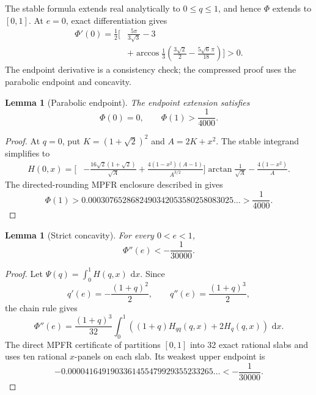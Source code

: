 \documentclass[11pt]{article}
\numberwithin{equation}{section}
\newtheorem{lemma}[theorem]{Lemma}
\theoremstyle{remark}
\newcommand{\dd}{\,\mathrm d}
\begin{document}
The stable formula extends real analytically to \(0\le q\le1\), and hence \(\Phi\) extends to \([0,1]\).  At \(e=0\), exact differentiation gives
\begin{equation}
\begin{aligned}
  \Phi'(0)=\frac12\bigg[&\frac{5\pi}{3\sqrt3}-3\\
  &+\arccos\frac13
  \left(\frac{3\sqrt2}{2}-\frac{5\sqrt6\,\pi}{18}\right)
  \bigg]>0.
\end{aligned}
\label{eq:phi-prime-zero}
\end{equation}
The endpoint derivative is a consistency check; the compressed proof uses the parabolic endpoint and concavity.

\begin{lemma}[Parabolic endpoint]
\label{lem:parabolic-endpoint}
The endpoint extension satisfies
\begin{equation}
  \Phi(0)=0,
  \qquad
  \Phi(1)>\frac1{4000}.
  \label{eq:endpoint-bound}
\end{equation}
\end{lemma}

\begin{proof}
At \(q=0\), put \(K=(1+\sqrt2)^2\) and \(A=2K+x^2\).  The stable integrand simplifies to
\begin{equation}
\begin{aligned}
H(0,x)=\bigg[&-\frac{16\sqrt2(1+\sqrt2)}{\sqrt A}
 +\frac{4(1-x^2)(A-1)}{A^{3/2}}\bigg]
 \arctan\frac1{\sqrt A}
 -\frac{4(1-x^2)}A.
\end{aligned}
\label{eq:endpoint-integrand}
\end{equation}
The directed-rounding MPFR enclosure described in  gives
\[
  \Phi(1)>
  0.0003076528682490342053580258083025\ldots
  >\frac1{4000}.
\]
\end{proof}

\begin{lemma}[Strict concavity]
\label{lem:concavity}
For every \(0<e<1\),
\begin{equation}
  \Phi''(e)<-\frac1{30000}.
  \label{eq:concavity-bound}
\end{equation}
\end{lemma}

\begin{proof}
Let \(\Psi(q)=\int_0^1H(q,x)\,\dd x\).  Since
\[
  q'(e)=-\frac{(1+q)^2}{2},
  \qquad
  q''(e)=\frac{(1+q)^3}{2},
\]
the chain rule gives
\begin{equation}
  \Phi''(e)=\frac{(1+q)^3}{32}
  \int_0^1\left((1+q)H_{qq}(q,x)+2H_q(q,x)\right)\,\dd x.
  \label{eq:concavity-identity}
\end{equation}
The direct MPFR certificate of  partitions \([0,1]\) into 32 exact rational slabs and uses ten rational \(x\)-panels on each slab.  Its weakest upper endpoint is
\[
  -0.0000416491903361455479929355233265\ldots
  <-\frac1{30000}.
\]
\end{proof}
\end{document}
